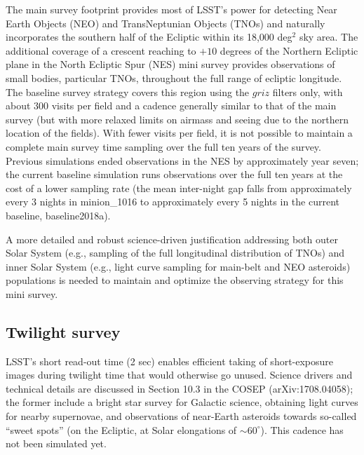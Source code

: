\documentclass[DM,toc,usenatbib]{lsstdoc}
\begin{document}
The main survey footprint provides most of LSST's power for detecting Near Earth Objects (NEO) and 
TransNeptunian Objects (TNOs) and naturally incorporates the southern half of the Ecliptic within its 
18,000 deg$^2$ sky area. The additional coverage of a crescent reaching to $+10$ degrees of the Northern Ecliptic 
plane in the North Ecliptic Spur (NES) mini survey provides observations of small bodies, particular TNOs, 
throughout the full range of ecliptic longitude. The baseline survey strategy covers this region using the 
$griz$ filters only, with about 300 visits per field and a cadence generally similar to that of the main survey
(but with more relaxed limits on airmass and seeing due to the northern location of the fields). With fewer visits per field,
it is not possible to maintain a complete main survey time sampling over the full ten years of the survey. Previous
simulations ended observations in the NES by approximately year seven; the current baseline simulation runs 
observations over the full ten years at the cost of a lower sampling rate (the mean inter-night gap falls from approximately
every 3 nights in minion\_1016 to approximately every 5 nights in the current baseline, baseline2018a).

A more detailed  and robust science-driven justification addressing both outer Solar System (e.g., sampling
of the full longitudinal distribution of TNOs) and inner Solar System (e.g., light curve sampling for main-belt 
and NEO asteroids) populations is needed to maintain and optimize the observing strategy for this
mini survey.  


\subsection{Twilight survey \label{sec:twilight}} 

LSST's short read-out time (2 sec) enables efficient taking of short-exposure images during twilight time 
that would otherwise go unused. Science drivers and technical details are discussed in Section 10.3 in the 
COSEP (arXiv:1708.04058); the former include a bright star survey for Galactic
science, obtaining light curves for nearby supernovae, and observations of near-Earth asteroids towards
so-called ``sweet spots'' (on the Ecliptic, at Solar elongations of $\sim60^\circ$). This cadence has not 
been simulated yet. 
\end{document}
